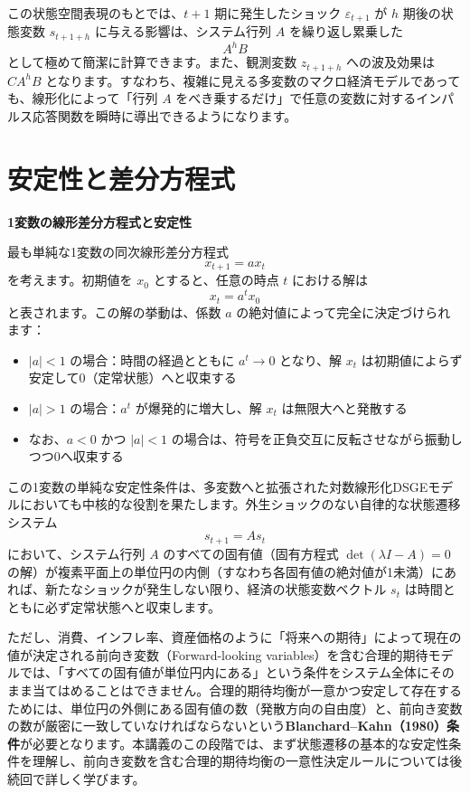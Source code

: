 \documentclass[
  japanese,
  lualatex,
  ja=standard,
  12pt,
  a4paper]{ltjsarticle}
\providecommand{\tightlist}{%
  \setlength{\itemsep}{0pt}\setlength{\parskip}{0pt}}
\begin{document}
この状態空間表現のもとでは、\(t+1\) 期に発生したショック
\(\varepsilon_{t+1}\) が \(h\) 期後の状態変数 \(s_{t+1+h}\)
に与える影響は、システム行列 \(A\) を繰り返し累乗した \[
A^hB
\] として極めて簡潔に計算できます。また、観測変数 \(z_{t+1+h}\)
への波及効果は \(CA^hB\)
となります。すなわち、複雑に見える多変数のマクロ経済モデルであっても、線形化によって「行列
\(A\)
をべき乗するだけ」で任意の変数に対するインパルス応答関数を瞬時に導出できるようになります。

\section{安定性と差分方程式}\label{ux5b89ux5b9aux6027ux3068ux5deeux5206ux65b9ux7a0bux5f0f}

\textbf{1変数の線形差分方程式と安定性}

最も単純な1変数の同次線形差分方程式 \[
x_{t+1}=a x_t
\] を考えます。初期値を \(x_0\) とすると、任意の時点 \(t\) における解は
\[
x_t=a^t x_0
\] と表されます。この解の挙動は、係数 \(a\)
の絶対値によって完全に決定づけられます：

\begin{itemize}
\tightlist
\item
  \(|a|<1\) の場合：時間の経過とともに \(a^t \to 0\) となり、解 \(x_t\)
  は初期値によらず安定して0（定常状態）へと収束する
\item
  \(|a|>1\) の場合：\(a^t\) が爆発的に増大し、解 \(x_t\)
  は無限大へと発散する
\item
  なお、\(a<0\) かつ \(|a|<1\)
  の場合は、符号を正負交互に反転させながら振動しつつ0へ収束する
\end{itemize}

この1変数の単純な安定性条件は、多変数へと拡張された対数線形化DSGEモデルにおいても中核的な役割を果たします。外生ショックのない自律的な状態遷移システム
\[
s_{t+1}=A s_t
\] において、システム行列 \(A\) のすべての固有値（固有方程式
\(\det(\lambda I - A) = 0\)
の解）が複素平面上の単位円の内側（すなわち各固有値の絶対値が1未満）にあれば、新たなショックが発生しない限り、経済の状態変数ベクトル
\(s_t\) は時間とともに必ず定常状態へと収束します。

ただし、消費、インフレ率、資産価格のように「将来への期待」によって現在の値が決定される前向き変数（Forward-looking
variables）を含む合理的期待モデルでは、「すべての固有値が単位円内にある」という条件をシステム全体にそのまま当てはめることはできません。合理的期待均衡が一意かつ安定して存在するためには、単位円の外側にある固有値の数（発散方向の自由度）と、前向き変数の数が厳密に一致していなければならないという\textbf{Blanchard--Kahn（1980）条件}が必要となります。本講義のこの段階では、まず状態遷移の基本的な安定性条件を理解し、前向き変数を含む合理的期待均衡の一意性決定ルールについては後続回で詳しく学びます。
\end{document}
